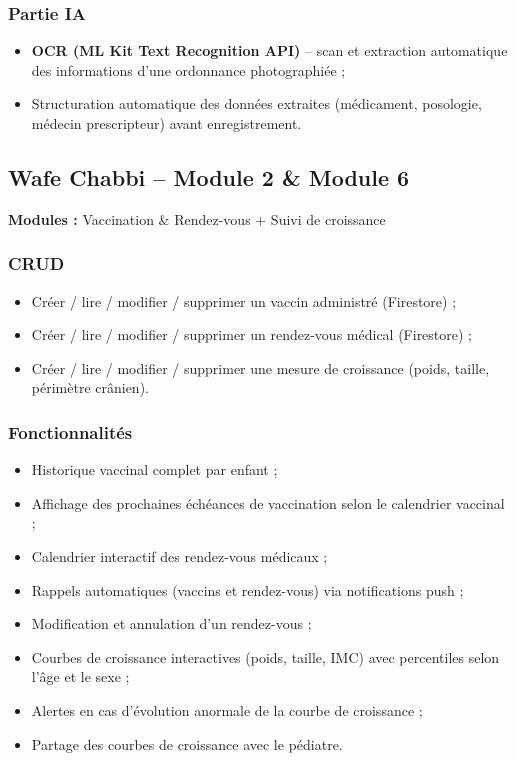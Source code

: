 \documentclass[11pt,a4paper]{article}
\begin{document}
\subsubsection*{Partie IA}
\begin{itemize}
  \item \textbf{OCR (ML Kit Text Recognition API)} -- scan et extraction automatique des informations d'une ordonnance photographiée ;
  \item Structuration automatique des données extraites (médicament, posologie, médecin prescripteur) avant enregistrement.
\end{itemize}

\vspace{0.5cm}
\subsection{Wafe Chabbi -- Module 2 \& Module 6}

\textbf{Modules :} Vaccination \& Rendez-vous + Suivi de croissance

\subsubsection*{CRUD}
\begin{itemize}
  \item Créer / lire / modifier / supprimer un vaccin administré (Firestore) ;
  \item Créer / lire / modifier / supprimer un rendez-vous médical (Firestore) ;
  \item Créer / lire / modifier / supprimer une mesure de croissance (poids, taille, périmètre crânien).
\end{itemize}

\subsubsection*{Fonctionnalités}
\begin{itemize}
  \item Historique vaccinal complet par enfant ;
  \item Affichage des prochaines échéances de vaccination selon le calendrier vaccinal ;
  \item Calendrier interactif des rendez-vous médicaux ;
  \item Rappels automatiques (vaccins et rendez-vous) via notifications push ;
  \item Modification et annulation d'un rendez-vous ;
  \item Courbes de croissance interactives (poids, taille, IMC) avec percentiles selon l'âge et le sexe ;
  \item Alertes en cas d'évolution anormale de la courbe de croissance ;
  \item Partage des courbes de croissance avec le pédiatre.
\end{itemize}
\end{document}
